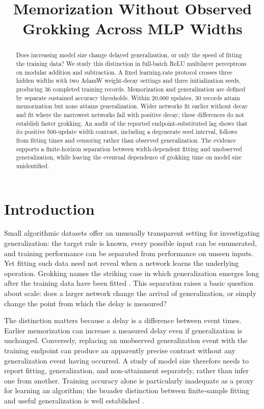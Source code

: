 \documentclass{article}
\title{Memorization Without Observed Grokking Across MLP Widths}
\author{}
\begin{document}
\maketitle

\begin{abstract}
Does increasing model size change delayed generalization, or only the speed of fitting the training data? We study this distinction in full-batch ReLU multilayer perceptrons on modular addition and subtraction. A fixed learning-rate protocol crosses three hidden widths with two AdamW weight-decay settings and three initialization seeds, producing 36 completed training records. Memorization and generalization are defined by separate sustained accuracy thresholds. Within 20,000 updates, 30 records attain memorization but none attains generalization. Wider networks fit earlier without decay and fit where the narrowest networks fail with positive decay; these differences do not establish faster grokking. An audit of the reported endpoint-substituted lag shows that its positive 500-update width contrast, including a degenerate seed interval, follows from fitting times and censoring rather than observed generalization. The evidence supports a finite-horizon separation between width-dependent fitting and unobserved generalization, while leaving the eventual dependence of grokking time on model size unidentified.
\end{abstract}

\section{Introduction}

Small algorithmic datasets offer an unusually transparent setting for investigating generalization: the target rule is known, every possible input can be enumerated, and training performance can be separated from performance on unseen inputs. Yet fitting such data need not reveal when a network learns the underlying operation. Grokking names the striking case in which generalization emerges long after the training data have been fitted \citep{Power2022GrokkingGB}. This separation raises a basic question about scale: does a larger network change the arrival of generalization, or simply change the point from which the delay is measured?

The distinction matters because a delay is a difference between event times. Earlier memorization can increase a measured delay even if generalization is unchanged. Conversely, replacing an unobserved generalization event with the training endpoint can produce an apparently precise contrast without any generalization event having occurred. A study of model size therefore needs to report fitting, generalization, and non-attainment separately, rather than infer one from another. Training accuracy alone is particularly inadequate as a proxy for learning an algorithm; the broader distinction between finite-sample fitting and useful generalization is well established \citep{Zhang2017Rethinking}.
\end{document}
